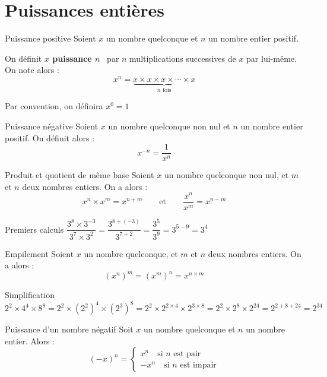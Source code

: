 \documentclass[oneside,12pt]{article}          %
\begin{document}
\section{Puissances entières}

\begin{definition}{Puissance positive} 
	Soient $x$ un nombre quelconque et $n$ un nombre entier positif. 
	
	On définit \og \textbf{$x$ puissance $n$} \fg\, par $n$ multiplications successives de $x$ par lui-même. On note alors :
	\[x^n = \underbrace{x \times x \times x \times \cdots \times x}_{n \text{ fois}} \]
	
	Par convention, on définira $x^0=1$
\end{definition}



\begin{definition}{Puissance négative}
	Soient $x$ un nombre quelconque non nul et $n$ un nombre entier positif. On définit alors :
	\[x^{-n}=\dfrac{1}{x^n}\]
\end{definition}



\begin{propriete}{Produit et quotient de même base}
	Soient $x$ un nombre quelconque non nul, et $m$ et $n$ deux nombres entiers. On a alors :
	\[ x^n \times x^m = x^{n+m} \qquad \text{et} \qquad \dfrac{x^n}{x^m}=x^{n-m} \]
\end{propriete}

\begin{exemple}{Premiers calculs}
	$\dfrac{3^8 \times 3^{-3}}{3^7 \times 3^2} = \dfrac{3^{8 + (-3)}}{3^{7+2}} = \dfrac{3^5}{3^9} = 3^{5-9} = 3^4$
\end{exemple}



\begin{propriete}{Empilement}
	Soient $x$ un nombre quelconque, et $m$ et $n$ deux nombres entiers. On a alors :
	\[ {(x^n)}^m = {(x^m)}^n = x^{n \times m} \]
\end{propriete}

\begin{exemple}{Simplification}
	$2^2 \times 4^4 \times 8^8 = 2^2 \times {(2^2)}^4 \times {(2^3)}^8 = 2^2 \times 2^{2 \times 4} \times 2^{3 \times 8} = 2^2 \times 2^8 \times 2^{24} = 2^{2 + 8 + 24} = 2^{34}$
\end{exemple}



\begin{propriete}{Puissance d'un nombre négatif}
	Soit $x$ un nombre quelconque et $n$ un nombre entier. Alors :
	\[(-x)^n = \begin{cases} x^n \quad \text{si $n$ est pair} \\ -x^n \quad \text{si $n$ est impair} \end{cases} \]
\end{propriete}
\end{document}
